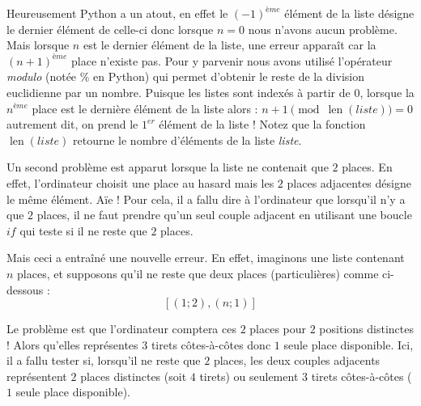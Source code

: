 \documentclass[a4paper,francais,11pt]{article}
\begin{document}
Heureusement Python a un atout, en effet le $\left(-1\right)^{ème}$ élément de la liste désigne le dernier élément de celle-ci donc lorsque $n=0$ nous n'avons aucun problème. Mais lorsque $n$ est le dernier élément de la liste, une erreur apparaît car la $\left(n+1\right)^{ème}$ place n'existe pas. Pour y parvenir nous avons utilisé l'opérateur \emph{modulo} (notée $\%$ en Python) qui permet d'obtenir le reste de la division euclidienne par un nombre. Puisque les listes sont indexés à partir de $0$, lorsque la $n^{ème}$ place est le dernière élément de la liste alors : $n+1\pmod{ \operatorname{len}\left(liste\right)}=0$ autrement dit, on prend le $1^{er}$ élément de la liste ! Notez que la fonction $\operatorname{len}\left(liste\right)$ retourne le nombre d'éléments de la liste \emph{liste}.

Un second problème est apparut lorsque la liste ne contenait que $2$ places. En effet, l'ordinateur choisit une place au hasard mais les $2$ places adjacentes désigne le même élément. Aïe ! Pour cela, il a fallu dire à l'ordinateur que lorsqu'il n'y a que $2$ places, il ne faut prendre qu'un seul couple adjacent en utilisant une boucle $if$ qui teste si il ne reste que $2$ places.

Mais ceci a entraîné une nouvelle erreur. En effet, imaginons une liste contenant $n$ places, et supposons qu'il ne reste que deux places (particulières) comme ci-dessous :
\[[(1;2),(n;1)]\]

Le problème est que l'ordinateur comptera ces $2$ places pour $2$ positions distinctes ! Alors qu'elles représentes $3$ tirets côtes-à-côtes donc $1$ seule place disponible. Ici, il a fallu tester si, lorsqu'il ne reste que $2$ places, les deux couples adjacents représentent $2$ places distinctes (soit $4$ tirets) ou seulement $3$ tirets côtes-à-côtes ($1$ seule place disponible).
\end{document}
